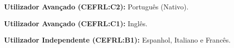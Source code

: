 

\begin{cventries}

  \cventry
    {}
    {}
    {}
    {} 
    {
	  \vspace{-0.5cm}
      \begin{cvitems} %
        \item[] {\hspace{-.31cm}\textbf{Utilizador Avançado (CEFRL:C2):} Português (Nativo).}
        \item[] {\hspace{-.31cm}\textbf{Utilizador Avançado (CEFRL:C1):} Inglês.}
        \item[] {\hspace{-.31cm}\textbf{Utilizador Independente (CEFRL:B1):} Espanhol, Italiano e Francês.}
      \end{cvitems}
    }

\end{cventries}
